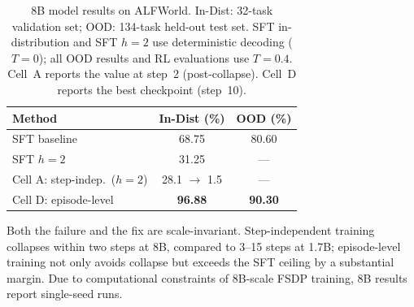\begin{table}[t]
\centering
\caption{8B model results on ALFWorld. In-Dist: 32-task validation set; OOD: 134-task held-out test set. SFT in-distribution and SFT $h{=}2$ use deterministic decoding ($T{=}0$); all OOD results and RL evaluations use $T{=}0.4$. Cell~A reports the value at step~2 (post-collapse). Cell~D reports the best checkpoint (step~10).}
\label{tab:8b_results}
\small
\begin{tabular}{@{}lcc@{}}
\toprule
\textbf{Method} & \textbf{In-Dist (\%)} & \textbf{OOD (\%)} \\
\midrule
SFT baseline & 68.75 & 80.60 \\  %
SFT $h{=}2$ & 31.25 & --- \\  %
Cell A: step-indep.\ ($h{=}2$) & 28.1 $\to$ 1.5 & --- \\  %
Cell D: episode-level & \textbf{96.88} & \textbf{90.30} \\  %
\bottomrule
\end{tabular}
\end{table}

Both the failure and the fix are scale-invariant. Step-independent training collapses within two steps at 8B, compared to 3--15 steps at 1.7B; episode-level training not only avoids collapse but exceeds the SFT ceiling by a substantial margin. Due to computational constraints of 8B-scale FSDP training, 8B results report single-seed runs.
